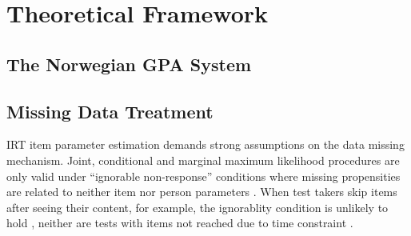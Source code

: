 \section{Theoretical Framework}

\subsection{The Norwegian GPA System}

\subsection{Missing Data Treatment}

IRT item parameter estimation demands strong assumptions on the data missing mechanism. Joint, conditional and marginal maximum likelihood procedures are only valid under ``ignorable non-response'' conditions where missing propensities are related to neither item nor person parameters \parencite{molenaar:1995}. When test takers skip items after seeing their content, for example, the ignorablity condition is unlikely to hold \parencite{mislevy:1987}, neither are tests with items not reached due to time constraint \parencite{lord:1974, lord:1983}.